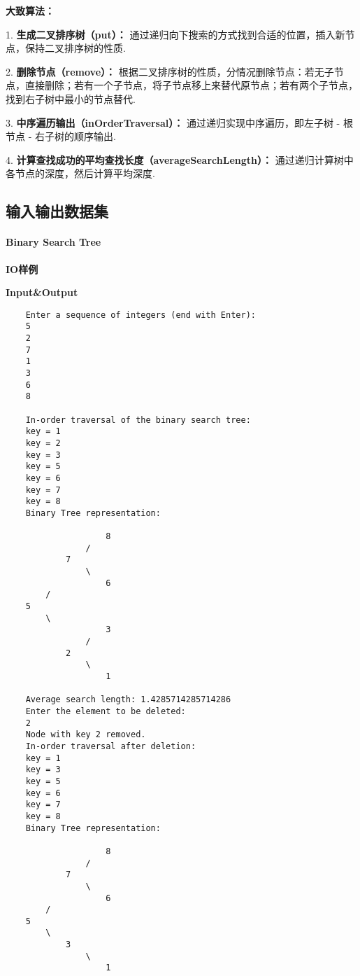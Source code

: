 \documentclass[UTF8]{ctexart}
\begin{document}
\textbf{大致算法：}

1. \textbf{生成二叉排序树（put）：} 通过递归向下搜索的方式找到合适的位置，插入新节点，保持二叉排序树的性质.

2. \textbf{删除节点（remove）：} 根据二叉排序树的性质，分情况删除节点：若无子节点，直接删除；若有一个子节点，将子节点移上来替代原节点；若有两个子节点，找到右子树中最小的节点替代.

3. \textbf{中序遍历输出（inOrderTraversal）：} 通过递归实现中序遍历，即左子树 - 根节点 - 右子树的顺序输出.

4. \textbf{计算查找成功的平均查找长度（averageSearchLength）：} 通过递归计算树中各节点的深度，然后计算平均深度.



\subsection*{输入输出数据集}

\paragraph*{Binary Search Tree}
\textbf{IO样例}
\begin{exampleframe}
\textbf{Input\&Output}
\begin{verbatim}
    Enter a sequence of integers (end with Enter):
    5
    2
    7
    1
    3
    6
    8
    
    In-order traversal of the binary search tree:
    key = 1
    key = 2
    key = 3
    key = 5
    key = 6
    key = 7
    key = 8
    Binary Tree representation:
    
                    8
                /
            7
                \
                    6
        /
    5
        \
                    3
                /
            2
                \
                    1
    
    Average search length: 1.4285714285714286
    Enter the element to be deleted:
    2
    Node with key 2 removed.
    In-order traversal after deletion:
    key = 1
    key = 3
    key = 5
    key = 6
    key = 7
    key = 8
    Binary Tree representation:
    
                    8
                /
            7
                \
                    6
        /
    5
        \
            3
                \
                    1
    
\end{verbatim}
\end{exampleframe}
\end{document}
